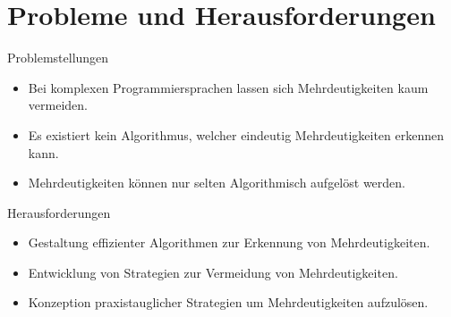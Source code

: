 \documentclass[t]{beamer}
\begin{document}
	\section{Probleme und Herausforderungen}\label{sec:probleme-und-herausforderungen}
	\begin{frame}
		\begin{block}{Problemstellungen}
			\begin{itemize}
				\item Bei komplexen Programmiersprachen lassen sich Mehrdeutigkeiten kaum vermeiden.
				\item Es existiert kein Algorithmus, welcher eindeutig Mehrdeutigkeiten erkennen kann.
				\item Mehrdeutigkeiten können nur selten Algorithmisch aufgelöst werden.
			\end{itemize}
		\end{block}
		\vspace{1em}
		\begin{block}{Herausforderungen}
			\begin{itemize}
				\item Gestaltung effizienter Algorithmen zur Erkennung von Mehrdeutigkeiten.
				\item Entwicklung von Strategien zur Vermeidung von Mehrdeutigkeiten.
				\item Konzeption praxistauglicher Strategien um Mehrdeutigkeiten aufzulösen.
			\end{itemize}
		\end{block}
	\end{frame}
\end{document}
